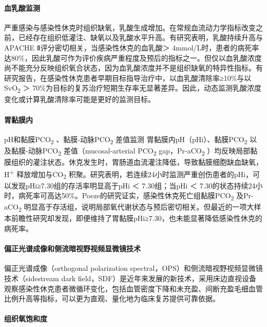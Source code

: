 \paragraph{血乳酸监测}

严重感染与感染性休克时组织缺氧，乳酸生成增加。在常规血流动力学指标改变之前，已经存在组织低灌注、缺氧以及乳酸水平升高。有研究表明，乳酸持续升高与APACHE
Ⅱ评分密切相关，当感染性休克的血乳酸＞
4mmol/L时，患者的病死率达80\%，因此乳酸可作为评价疾病严重程度及预后的指标之一。但仅以血乳酸浓度尚不能充分反映组织氧合状态，因为血乳酸浓度并不是组织缺氧的特异性指标。有研究报告，在感染性休克患者早期目标指导治疗中，以血乳酸清除率≥10\%与以SvO\textsubscript{2}
＞
70\%为目标的复苏治疗短期生存率无显著差异。因此，动态监测乳酸浓度变化或计算乳酸清除率可能是更好的监测目标。

\paragraph{胃黏膜内}

pH和黏膜PCO\textsubscript{2} 、黏膜-动脉PCO\textsubscript{2} 差值监测
胃黏膜内pH（pHi）、黏膜PCO\textsubscript{2}
以及黏膜-动脉PCO\textsubscript{2} 差值（mucosal-arterial
PCO\textsubscript{2} gap，Pr-aCO\textsubscript{2}
）均反映局部黏膜组织的灌注状态。休克发生时，胃肠道血流灌注降低，导致黏膜细胞缺血缺氧，H\textsuperscript{+}
释放增加与CO\textsubscript{2}
积聚。研究表明，若连续24小时监测严重创伤患者的pHi，可以发现pHi≥7.30组的存活率明显高于pHi
＜ 7.30组；当pHi ＜
7.30的状态持续24小时，病死率可高达50\%。Poeze的研究证实，感染性休克死亡组黏膜PCO\textsubscript{2}
及Pr-aCO\textsubscript{2}
明显高于存活组，说明局部氧代谢状态与预后密切相关。但最近的一项大样本前瞻性研究却发现，即便维持了胃黏膜pHi≥7.30，也未能显著降低感染性休克的病死率。

\paragraph{偏正光谱成像和侧流暗视野视频显微镜技术}

偏正光谱成像（orthogonal polarization
spectral，OPS）和侧流暗视野视频显微镜技术（sidestream dark
field，SDF）是近年来发展的新技术，采用床边直视设备观察感染性休克患者微循环变化，包括血管密度下降和未充盈、间断充盈毛细血管比例升高等指标，可以更为直观、量化地为临床复苏提供可靠依据。

\paragraph{组织氧饱和度}

